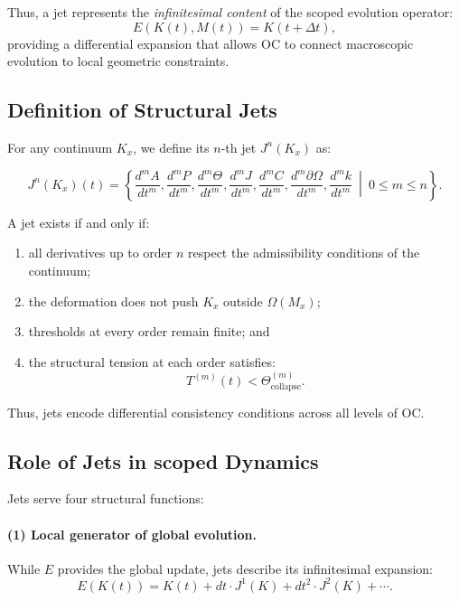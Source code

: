 Thus, a jet represents the \emph{infinitesimal content} of the scoped
evolution operator:
\[
E(K(t), M(t)) = K(t+\Delta t),
\]
providing a differential expansion that allows OC to connect macroscopic
evolution to local geometric constraints.



\subsection{Definition of Structural Jets}

For any continuum $K_x$, we define its $n$-th jet $J^n(K_x)$ as:

\begin{equation}
J^n(K_x)(t) =
\left\{
\frac{d^m A}{dt^m},
\frac{d^m P}{dt^m},
\frac{d^m \Theta}{dt^m},
\frac{d^m J}{dt^m},
\frac{d^m C}{dt^m},
\frac{d^m \partial\Omega}{dt^m},
\frac{d^m k}{dt^m}
\ \middle|\
0 \le m \le n
\right\}.
\end{equation}

A jet exists if and only if:

\begin{enumerate}
    \item all derivatives up to order $n$ respect the admissibility
    conditions of the continuum;
    \item the deformation does not push $K_x$ outside $\Omega(M_x)$;
    \item thresholds at every order remain finite; and
    \item the structural tension at each order satisfies:
    \[
        T^{(m)}(t) < \Theta_{\mathrm{collapse}}^{(m)}.
    \]
\end{enumerate}

Thus, jets encode differential consistency conditions across all levels
of OC.



\subsection{Role of Jets in scoped Dynamics}

Jets serve four structural functions:

\paragraph{(1) Local generator of global evolution.}
While $E$ provides the global update, jets describe its infinitesimal
expansion:
\[
E(K(t)) = K(t) + dt \cdot J^1(K) + dt^2 \cdot J^2(K) + \cdots.
\]

